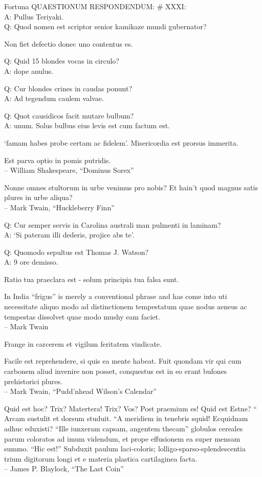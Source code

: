 \documentclass[titlepage,12pt]{memoir}
\begin{document}
Fortuna QUAESTIONUM RESPONDENDUM: \# XXXI:\\
A: Pullus Teriyaki.
\\Q: Quod nomen est scriptor senior kamikaze mundi gubernator?

Non fiet defectio donec uno contentus es.

Q: Quid 15 blondes vocas in circulo?\\
A: dope anulus.

Q: Cur blondes crines in caudas ponunt?\\
A: Ad tegendum caulem valvae.

Q: Quot causidicos facit mutare bulbum?\\
A: unum. Solus bulbus eius levis est cum factum est.

‘famam habes probe certam ac fidelem’.
Misericordia est prorsus immerita.

Est parva optio in pomis putridis.
\\-- William Shakespeare, “Dominus Sorex”

Nonne omnes stultorum in urbe venimus pro nobis? Et hain’t quod magnus
satis plures in urbe aliqua?
\\-- Mark Twain, “Huckleberry Finn”

Q: Cur semper servis in Carolina australi man
pulmenti in laminam?\\
A: ‘Si pateram illi dederis, projice abs te’.

Q: Quomodo sepultus est Thomas J. Watson?\\
A: 9 ore demisso.

Ratio tua praeclara est - solum principia tua falsa sunt.

In India “frigus” is merely a conventional phrase and has come into
uti necessitate aliquo modo ad distinctionem tempestatum
quae nodus aeneus ac tempestas dissolvet quae modo mushy eam faciet.
\\-- Mark Twain

Frange in carcerem et vigilum feritatem vindicate.

Facile est reprehendere, si quis ea mente habeat. Fuit quondam vir
qui cum carbonem aliud invenire non posset, conquestus est
in eo erant bufones prehistorici plures.
\\-- Mark Twain, “Pudd’nhead Wilson’s Calendar”

Quid est hoc? Trix? Matertera! Trix? Vos? Post praemium es! Quid est
Estne? “ Arcam sustulit et dorsum studuit. “A meridiem in tenebris
squid! Ecquidnam adhuc eduxisti? “Ille iunxeram capsam, angentem thecam”
globulos cereales parum coloratos ad imum videndum, et prope effusionem
ea super mensam summo. “Hic est!” Subduxit paulum laci-coloris;
lolligo-sparso-splendescentia trium digitorum longi et e materia plastica cartilaginea facta.
\\-- James P. Blaylock, “The Last Coin”
\end{document}
